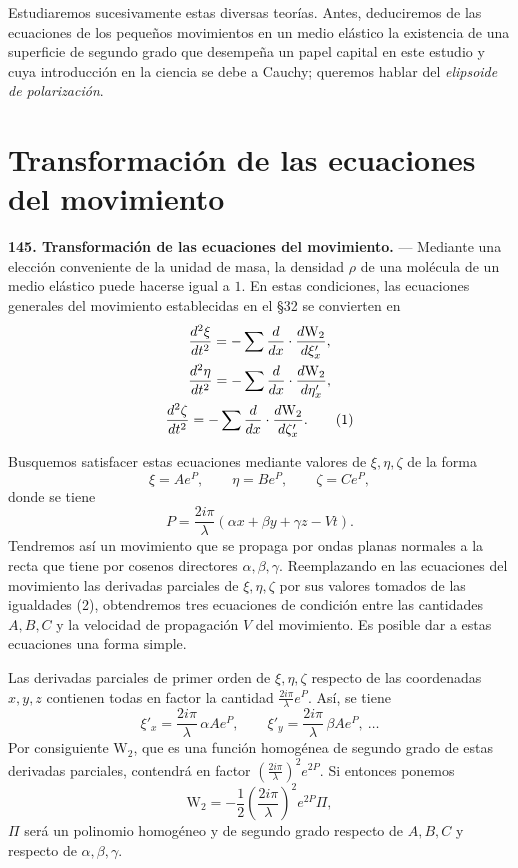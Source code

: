 Estudiaremos sucesivamente estas diversas teorías. Antes, deduciremos de las
ecuaciones de los pequeños movimientos en un medio elástico la existencia
de una superficie de segundo grado que desempeña un papel capital en este
estudio y cuya introducción en la ciencia se debe a Cauchy; queremos hablar
del \emph{elipsoide de polarización}.

\section{Transformación de las ecuaciones del movimiento}

\noindent\textbf{145. Transformación de las ecuaciones del movimiento.} —
Mediante una elección conveniente de la unidad de masa, la densidad $\rho$
de una molécula de un medio elástico puede hacerse igual a $1$. En estas
condiciones, las ecuaciones generales del movimiento establecidas en el
§32 se convierten en
\begin{gather}
\frac{d^2\xi}{dt^2}=-\sum\frac{d}{dx}\cdot\frac{d\mathrm{W}_2}{d\xi'_x},\notag\\
\frac{d^2\eta}{dt^2}=-\sum\frac{d}{dx}\cdot\frac{d\mathrm{W}_2}{d\eta'_x},\notag\\
\frac{d^2\zeta}{dt^2}=-\sum\frac{d}{dx}\cdot\frac{d\mathrm{W}_2}{d\zeta'_x}.
\tag{1}
\end{gather}

Busquemos satisfacer estas ecuaciones mediante valores de $\xi,\eta,\zeta$
de la forma
\begin{equation}
\xi=A e^{P},\qquad \eta=Be^{P},\qquad \zeta=Ce^{P},
\tag{2}
\end{equation}
donde se tiene
\[
P=\frac{2i\pi}{\lambda}(\alpha x+\beta y+\gamma z - Vt).
\]
Tendremos así un movimiento que se propaga por ondas planas normales a la
recta que tiene por cosenos directores $\alpha,\beta,\gamma$. Reemplazando
en las ecuaciones del movimiento las derivadas parciales de
$\xi,\eta,\zeta$ por sus valores tomados de las igualdades (2),
obtendremos tres ecuaciones de condición entre las cantidades $A,B,C$ y la
velocidad de propagación $V$ del movimiento. Es posible dar a estas
ecuaciones una forma simple.

Las derivadas parciales de primer orden de $\xi,\eta,\zeta$ respecto de
las coordenadas $x,y,z$ contienen todas en factor la cantidad
$\frac{2i\pi}{\lambda}e^{P}$. Así, se tiene
\[
\xi'_x=\frac{2i\pi}{\lambda}\,\alpha A e^{P},\qquad
\xi'_y=\frac{2i\pi}{\lambda}\,\beta A e^{P},\ \ldots
\]
Por consiguiente $\mathrm{W}_2$, que es una función homogénea de segundo grado de
estas derivadas parciales, contendrá en factor
$\left(\frac{2i\pi}{\lambda}\right)^2 e^{2P}$. Si entonces ponemos
\[
\mathrm{W}_2=-\frac{1}{2}\left(\frac{2i\pi}{\lambda}\right)^2 e^{2P}\Pi,
\]
$\Pi$ será un polinomio homogéneo y de segundo grado respecto de $A,B,C$ y
respecto de $\alpha,\beta,\gamma$.


